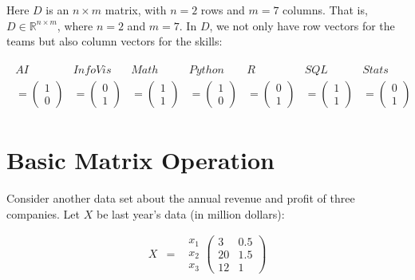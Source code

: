 \documentclass[
  letterpaper,
]{scrbook}
\begin{document}
Here \(D\) is an \(n \times m\) matrix, with \(n=2\) rows and \(m=7\)
columns. That is, \(D \in \mathbb{R}^{n\times m}\), where \(n=2\) and
\(m=7\). In \(D\), we not only have row vectors for the teams but also
column vectors for the skills:

\[\begin{aligned}
\begin{matrix}
  AI & InfoVis & Math & Python & R & SQL & Stats \\
  = \begin{pmatrix} 1 \\ 0 \end{pmatrix} &
  = \begin{pmatrix} 0 \\ 1 \end{pmatrix} &
  = \begin{pmatrix} 1 \\ 1 \end{pmatrix} &
  = \begin{pmatrix} 1 \\ 0 \end{pmatrix} &
  = \begin{pmatrix} 0 \\ 1 \end{pmatrix} &
  = \begin{pmatrix} 1 \\ 1 \end{pmatrix} &
  =\begin{pmatrix} 0 \\ 1 \end{pmatrix}
\end{matrix}
\end{aligned}\]

\section{Basic Matrix Operation}\label{basic-matrix-operation}

Consider another data set about the annual revenue and profit of three
companies. Let \(X\) be last year's data (in million dollars):

\[\begin{aligned}
    X   & = &
    \begin{matrix}
        x_1 \\
        x_2 \\
        x_3
    \end{matrix}
    \begin{pmatrix}
        3 & 0.5 \\
        20 & 1.5 \\
        12 & 1
    \end{pmatrix}
\end{aligned}\]
\end{document}
